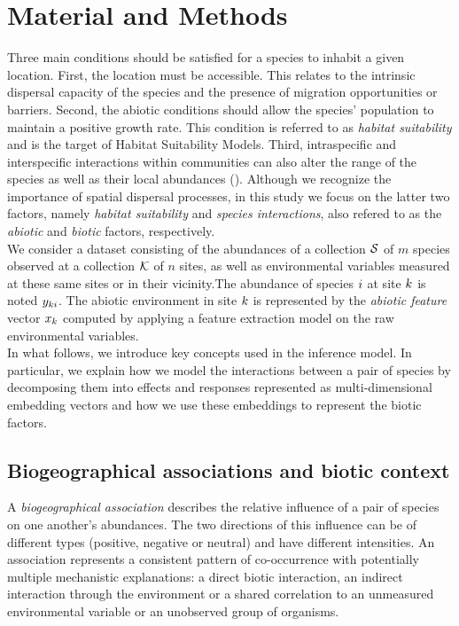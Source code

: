 \documentclass[10pt,a4paper]{article}
\begin{document}
\section{Material and Methods}
Three main conditions should be satisfied for a species to inhabit a given location. First, the location must be accessible. This relates to the intrinsic dispersal capacity of the species and the presence of migration opportunities or barriers.  Second, the abiotic conditions should allow the species' population to maintain a positive growth rate. This condition is referred to as \emph{habitat suitability} and is the target of Habitat Suitability Models. Third, intraspecific and interspecific interactions within communities can also alter the range of the species as well as their local abundances (\cite{guisan2017habitat}). Although we recognize the importance of spatial dispersal processes, in this study we focus on the latter two factors, namely \emph{habitat suitability} and \emph{species interactions}, also refered to as the \emph{abiotic} and \emph{biotic} factors, respectively.\\

We consider a dataset consisting of the abundances of a collection $\mathcal{S}$ of $m$ species observed at a collection $\mathcal{K}$ of $n$ sites, as well as environmental variables measured at these same sites or in their vicinity.The abundance of species $i$ at site $k$ is noted $y_{ki}$. The abiotic environment in site $k$ is represented by the \emph{abiotic feature} vector $x_{k}$ computed by applying a feature extraction model on the raw environmental variables. \\

In what follows, we introduce key concepts used in the inference model. In particular, we explain how we model the interactions between a pair of species by decomposing them into effects and responses represented as multi-dimensional embedding vectors and how we use these embeddings to represent the biotic factors.

\subsection{Biogeographical associations and biotic context}
A \textit{biogeographical association} describes the relative influence of a pair of species on one another's abundances.  The two directions of this influence can be of different types (positive, negative or neutral) and have different intensities.  An association represents a consistent pattern of co-occurrence with potentially multiple mechanistic explanations: a direct biotic interaction, an indirect interaction through the environment or a shared correlation to an unmeasured environmental variable or an unobserved group of organisms.
\end{document}

